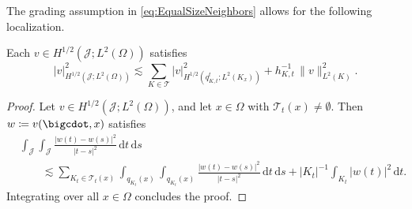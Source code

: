 \documentclass{amsart}
\providecommand{\tria}{\mathcal{T}}
\providecommand{\dt}{\,\mathrm{d}t}
\providecommand{\ds}{\,\mathrm{d}s}
\newcommand{\cJ}{\mathcal J}
\begin{document}
%
The grading assumption in \eqref{eq:EqualSizeNeighbors} allows for the following localization.
\begin{lemma}\label{lem:localizedGeneral}
Each $v\in H^{1/2}(\mathcal{J};L^2(\Omega))$ satisfies 
\begin{equation}
\lvert v \rvert_{H^{1/2}(\cJ;L^2(\Omega))}^2 \lesssim \sum_{K\in \tria} \lvert v \rvert_{H^{1/2}(q_{K,t}^t;L^2(K_x))}^2 + h_{K,t}^{-1}\, \lVert v \rVert^2_{L^2(K)}.
\end{equation}
\end{lemma}
\begin{proof}
Let $v\in H^{1/2}(\mathcal{J};L^2(\Omega))$, and let $x \in \Omega$ with $\tria_t(x) \neq \emptyset$. Then $w \coloneqq v(\bigcdot,x)$ satisfies \cite[Lem.~4.2]{CarstensenFaermann01}
\begin{align*}
&\int_\mathcal{J} \int_\mathcal{J} \frac{|w(t)-w(s)|^2}{|t-s|^2} \dt\ds\\
&\qquad  \lesssim \sum_{K_t\in \tria_t(x)}  \int_{q_{K_t}(x)}  \int_{q_{K_t}(x)} \frac{|w(t)-w(s)|^2}{|t-s|^2} \dt\ds + |K_t|^{-1} \int_{K_t} |w(t)|^2 \dt.
\end{align*}
Integrating over all $x\in \Omega$ concludes the proof.
\end{proof}
\end{document}
